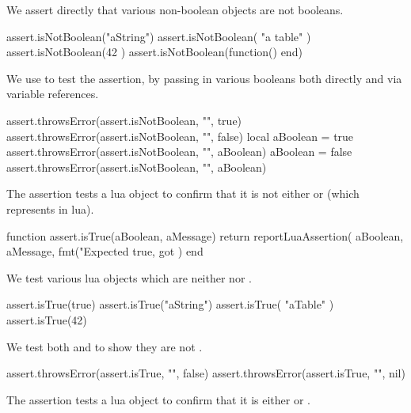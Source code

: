 
We assert directly that various non-boolean objects are not booleans. 

\startLuaTest
  assert.isNotBoolean("aString")
  assert.isNotBoolean({ "a table" })
  assert.isNotBoolean(42 )
  assert.isNotBoolean(function() end)
\stopLuaTest
\stopTestCase


We use  to test the  
assertion, by passing in various booleans both directly and via variable 
references. 

\startLuaTest
  assert.throwsError(assert.isNotBoolean, "", true)
  assert.throwsError(assert.isNotBoolean, "", false)
  local aBoolean = true
  assert.throwsError(assert.isNotBoolean, "", aBoolean)
  aBoolean = false
  assert.throwsError(assert.isNotBoolean, "", aBoolean)
\stopLuaTest
\stopTestCase

\stopTestSuite


The  assertion tests a lua object to confirm that it 
is not either  or  (which represents  
in lua). 

\startLuaCode
function assert.isTrue(aBoolean, aMessage)
  return reportLuaAssertion(
    aBoolean,
    aMessage,
    fmt("Expected true, got %
  )
end
\stopLuaCode


We test various lua objects which are neither  nor . 

\startLuaTest
  assert.isTrue(true)
  assert.isTrue("aString")
  assert.isTrue({ "aTable" })
  assert.isTrue(42)
\stopLuaTest
\stopTestCase


We test both  and  to show they are not 
. 

\startLuaTest
  assert.throwsError(assert.isTrue, "", false)
  assert.throwsError(assert.isTrue, "", nil)
\stopLuaTest
\stopTestCase

\stopTestSuite


The  assertion tests a lua object to confirm that it 
is either  or . 

